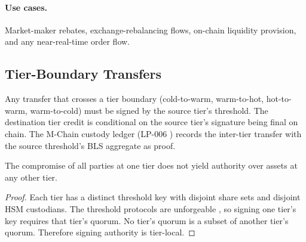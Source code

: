 \paragraph{Use cases.} Market-maker rebates, exchange-rebalancing
flows, on-chain liquidity provision, and any near-real-time order
flow.

\subsection{Tier-Boundary Transfers}

Any transfer that crosses a tier boundary (cold-to-warm, warm-to-hot,
hot-to-warm, warm-to-cold) must be signed by the source tier's
threshold. The destination tier credit is conditional on the source
tier's signature being final on chain. The M-Chain custody ledger
(LP-006 \cite{lp006}) records the inter-tier transfer with the source
threshold's BLS aggregate as proof.

\begin{theorem}
\label{thm:tier-indep}
The compromise of all parties at one tier does not yield authority
over assets at any other tier.
\end{theorem}

\begin{proof}
Each tier has a distinct threshold key with disjoint share sets and
disjoint HSM custodians. The threshold protocols are unforgeable
\cite{cggmp21}, so signing one tier's key requires that tier's
quorum. No tier's quorum is a subset of another tier's quorum.
Therefore signing authority is tier-local.
\end{proof}

